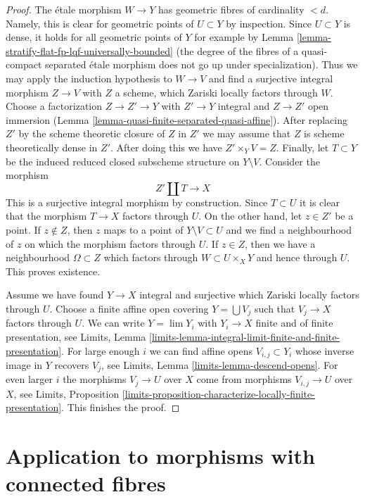 \begin{proof}
\medskip\noindent
The \'etale morphism $W \to Y$ has geometric fibres of cardinality $< d$.
Namely, this is clear for geometric points of $U \subset Y$ by inspection.
Since $U \subset Y$ is dense, it holds for all geometric points of $Y$
for example by Lemma
\ref{lemma-stratify-flat-fp-lqf-universally-bounded}
(the degree of the fibres of a quasi-compact separated \'etale morphism
does not go up under specialization). Thus we may apply the induction
hypothesis to $W \to V$ and find a surjective integral morphism
$Z \to V$ with $Z$ a scheme, which Zariski locally factors through $W$.
Choose a factorization $Z \to Z' \to Y$ with $Z' \to Y$ integral and
$Z \to Z'$ open immersion
(Lemma \ref{lemma-quasi-finite-separated-quasi-affine}).
After replacing $Z'$ by the scheme theoretic closure of $Z$ in $Z'$
we may assume that $Z$ is scheme theoretically dense in $Z'$.
After doing this we have $Z' \times_Y V = Z$. Finally,
let $T \subset Y$ be the induced reduced closed subscheme structure
on $Y \setminus V$. Consider the morphism
$$
Z' \amalg T \longrightarrow X
$$
This is a surjective integral morphism by construction.
Since $T \subset U$ it is clear that the morphism $T \to X$
factors through $U$. On the other hand, let $z \in Z'$
be a point. If $z \not \in Z$, then $z$ maps to a point of
$Y \setminus V \subset U$ and we find a neighbourhood of $z$
on which the morphism factors through $U$.
If $z \in Z$, then we have a neighbourhood $\Omega \subset Z$
which factors through $W \subset U \times_X Y$ and hence through $U$.
This proves existence.

\medskip\noindent
Assume we have found $Y \to X$ integral and surjective which Zariski
locally factors through $U$. Choose a finite affine open covering
$Y = \bigcup V_j$ such that $V_j \to X$ factors through $U$. We can
write $Y = \lim Y_i$ with $Y_i \to X$ finite and of finite
presentation, see Limits, Lemma
\ref{limits-lemma-integral-limit-finite-and-finite-presentation}.
For large enough $i$ we can find affine opens $V_{i, j} \subset Y_i$
whose inverse image in $Y$ recovers $V_j$, see
Limits, Lemma \ref{limits-lemma-descend-opens}.
For even larger $i$ the morphisms $V_j \to U$ over $X$ come
from morphisms $V_{i, j} \to U$ over $X$, see
Limits, Proposition
\ref{limits-proposition-characterize-locally-finite-presentation}.
This finishes the proof.
\end{proof}







\section{Application to morphisms with connected fibres}
\label{section-application-geometrically-connected}

